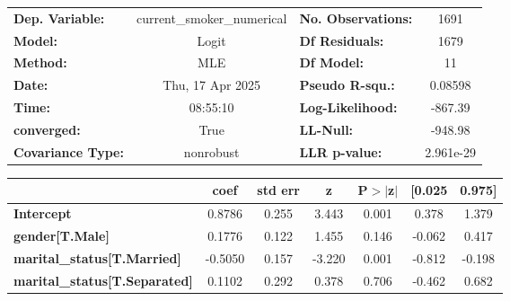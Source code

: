 \begin{center}
\begin{tabular}{lclc}
\toprule
\textbf{Dep. Variable:}                                           & current\_smoker\_numerical & \textbf{  No. Observations:  } &     1691    \\
\textbf{Model:}                                                   &           Logit            & \textbf{  Df Residuals:      } &     1679    \\
\textbf{Method:}                                                  &            MLE             & \textbf{  Df Model:          } &       11    \\
\textbf{Date:}                                                    &      Thu, 17 Apr 2025      & \textbf{  Pseudo R-squ.:     } &  0.08598    \\
\textbf{Time:}                                                    &          08:55:10          & \textbf{  Log-Likelihood:    } &   -867.39   \\
\textbf{converged:}                                               &            True            & \textbf{  LL-Null:           } &   -948.98   \\
\textbf{Covariance Type:}                                         &         nonrobust          & \textbf{  LLR p-value:       } & 2.961e-29   \\
\bottomrule
\end{tabular}
\begin{tabular}{lcccccc}
                                                                  & \textbf{coef} & \textbf{std err} & \textbf{z} & \textbf{P$> |$z$|$} & \textbf{[0.025} & \textbf{0.975]}  \\
\midrule
\textbf{Intercept}                                                &       0.8786  &        0.255     &     3.443  &         0.001        &        0.378    &        1.379     \\
\textbf{gender[T.Male]}                                           &       0.1776  &        0.122     &     1.455  &         0.146        &       -0.062    &        0.417     \\
\textbf{marital\_status[T.Married]}                               &      -0.5050  &        0.157     &    -3.220  &         0.001        &       -0.812    &       -0.198     \\
\textbf{marital\_status[T.Separated]}                             &       0.1102  &        0.292     &     0.378  &         0.706        &       -0.462    &        0.682     \\

\end{tabular}
\end{center}
